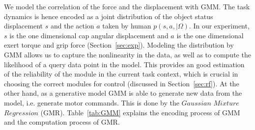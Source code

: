 We model the correlation of the force and the displacement with GMM. The task dynamics is hence encoded as a joint distribution of the object status displacement $s$ and the action $a$ taken by human $p(s,a,{\mid}{\Omega})$. In our experiment, $s$ is the one dimensional cap angular displacement and $a$ is the one dimensional exert torque and grip force (Section~\ref{sec:exp}).
Modeling the distribution by GMM allows us to capture the nonlinearity in the data, as well as to compute the likelihood of a query data point in the model. This provides an good estimation of the reliability of the module in the current task context, which is crucial in choosing the correct modules for control (discussed in Section~\ref{sec:rf}). At the other hand, as a generative model GMM is able to generate new data from the model, i.e. generate motor commands. This is done by the $Gaussian$ $Mixture$ $Regression$ (GMR). Table~\ref{tab:GMM} explains the encoding process of GMM and the computation process of GMR.




